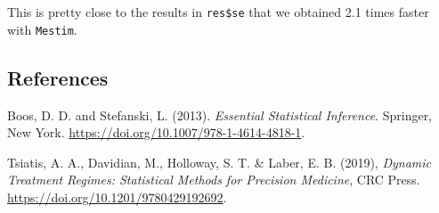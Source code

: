 \documentclass[
]{article}
\begin{document}
This is pretty close to the results in \texttt{res\$se} that we obtained
2.1 times faster with \texttt{Mestim}.

\hypertarget{references}{%
\subsection{References}\label{references}}

Boos, D. D. and Stefanski, L. (2013). \emph{Essential Statistical
Inference}. Springer, New York.
\url{https://doi.org/10.1007/978-1-4614-4818-1}.

Tsiatis, A. A., Davidian, M., Holloway, S. T. \& Laber, E. B. (2019),
\emph{Dynamic Treatment Regimes: Statistical Methods for Precision
Medicine}, CRC Press. \url{https://doi.org/10.1201/9780429192692}.
\end{document}

